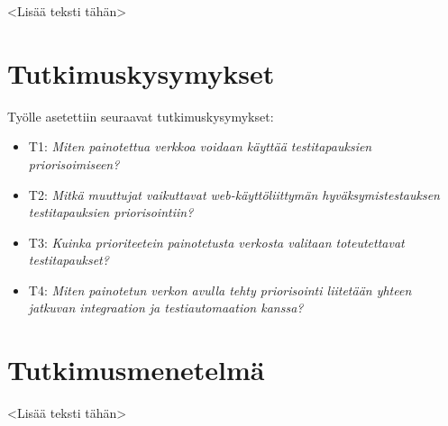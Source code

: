 <Lisää teksti tähän>

\section{Tutkimuskysymykset}

Työlle asetettiin seuraavat tutkimuskysymykset:
\begin{itemize}
	\item T1: \emph{Miten painotettua verkkoa voidaan käyttää testitapauksien priorisoimiseen?}
  \item T2: \emph{Mitkä muuttujat vaikuttavat web-käyttöliittymän hyväksymistestauksen testitapauksien priorisointiin?}
  \item T3: \emph{Kuinka prioriteetein painotetusta verkosta valitaan toteutettavat testitapaukset?}
  \item T4: \emph{Miten painotetun verkon avulla tehty priorisointi liitetään yhteen jatkuvan integraation ja testiautomaation kanssa?}
\end{itemize}

\section{Tutkimusmenetelmä}

<Lisää teksti tähän>

